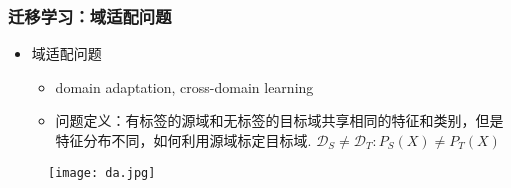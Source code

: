 \begin{frame}
    \frametitle{迁移学习：域适配问题}
    \begin{itemize}
        \item 域适配问题
            \begin{itemize}
                \item domain adaptation, cross-domain learning
                \item 问题定义：有标签的源域和无标签的目标域共享相同的特征和类别，但是特征分布不同，如何利用源域标定目标域.
                $\mathcal{D}_S \neq \mathcal{D}_T: P_S(X) \neq P_T(X)$
            \end{itemize}
    \end{itemize}
    \begin{figure}
        \texttt{[image: da.jpg]}
    \end{figure}
\end{frame}

